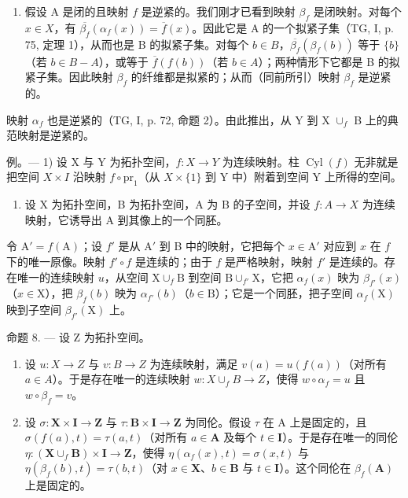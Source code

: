 \begin{enumerate}
\def\labelenumi{\arabic{enumi})}
\setcounter{enumi}{2}
\tightlist
\item
  假设 A 是闭的且映射 \(f\) 是逆紧的。我们刚才已看到映射 \(\beta_f\) 是闭映射。对每个 \(x \in X\)，有 \(\overline{\beta_f}(\alpha_f(x)) = \overline{f}(x)\)。因此它是 A 的一个拟紧子集（TG, I, p. 75, 定理 1），从而也是 B 的拟紧子集。对每个 \(b \in B\)，\(\overline{\beta_f}(\beta_f(b))\) 等于 \(\{b\}\)（若 \(b \in B - A\)），或等于 \(\overline{f}(f(b))\)（若 \(b \in A\)）；两种情形下它都是 B 的拟紧子集。因此映射 \(\beta_{f}\) 的纤维都是拟紧的；从而（同前所引）映射 \(\beta_{f}\) 是逆紧的。
\end{enumerate}

映射 \(\alpha_{f}\) 也是逆紧的（TG, I, p. 72, 命题 2）。由此推出，从 Y 到 X \(\cup_{f}\) B 上的典范映射是逆紧的。

例。--- 1) 设 X 与 Y 为拓扑空间，\(f\colon X\to Y\) 为连续映射。柱 \(\operatorname{Cyl}(f)\) 无非就是把空间 \(X\times I\) 沿映射 \(f\circ \mathrm{pr}_1\)（从 \(X\times \{1\}\) 到 Y 中）附着到空间 Y 上所得的空间。

\begin{enumerate}
\def\labelenumi{\arabic{enumi})}
\setcounter{enumi}{1}
\tightlist
\item
  设 X 为拓扑空间，B 为拓扑空间，A 为 B 的子空间，并设 \(f: A \to X\) 为连续映射，它诱导出 A 到其像上的一个同胚。
\end{enumerate}

令 \(\mathrm{A}' = f(\mathrm{A})\)；设 \(f'\) 是从 \(\mathrm{A}'\) 到 B 中的映射，它把每个 \(x \in \mathrm{A}'\) 对应到 \(x\) 在 \(f\) 下的唯一原像。映射 \(f' \circ f\) 是连续的；由于 \(f\) 是严格映射，映射 \(f'\) 是连续的。存在唯一的连续映射 \(u\)，从空间 \(\mathrm{X} \cup_f \mathrm{B}\) 到空间 \(\mathrm{B} \cup_{f'} \mathrm{X}\)，它把 \(\alpha_f(x)\) 映为 \(\beta_{f'}(x)\)（\(x \in \mathrm{X}\)），把 \(\beta_f(b)\) 映为 \(\alpha_{f'}(b)\)（\(b \in \mathrm{B}\)）；它是一个同胚，把子空间 \(\alpha_f(\mathrm{X})\) 映到子空间 \(\beta_{f'}(\mathrm{X})\) 上。

命题 8. --- 设 Z 为拓扑空间。

\begin{enumerate}
\def\labelenumi{\alph{enumi})}
\item
  设 \(u \colon X \to Z\) 与 \(v \colon B \to Z\) 为连续映射，满足 \(v(a) = u(f(a))\)（对所有 \(a \in A\)）。于是存在唯一的连续映射 \(w \colon X \cup_f B \to Z\)，使得 \(w \circ \alpha_f = u\) 且 \(w \circ \beta_f = v\)。
\item
  设 \(\sigma\colon\mathbf{X}\times\mathbf{I}\to\mathbf{Z}\) 与 \(\tau\colon\mathbf{B}\times\mathbf{I}\to\mathbf{Z}\) 为同伦。假设 \(\tau\) 在 A 上是固定的，且 \(\sigma(f(a),t)=\tau(a,t)\)（对所有 \(a\in\mathbf{A}\) 及每个 \(t\in\mathbf{I}\)）。于是存在唯一的同伦 \(\eta\colon(\mathbf{X}\cup_{f}\mathbf{B})\times\mathbf{I}\to\mathbf{Z}\)，使得 \(\eta(\alpha_{f}(x),t)=\sigma(x,t)\) 与 \(\eta(\beta_{f}(b),t)=\tau(b,t)\)（对 \(x\in\mathbf{X}\)、\(b\in\mathbf{B}\) 与 \(t\in\mathbf{I}\)）。这个同伦在 \(\beta_{f}(\mathbf{A})\) 上是固定的。
\end{enumerate}

